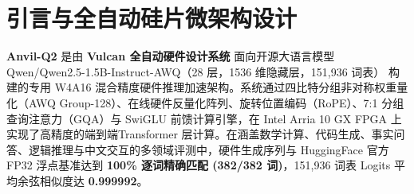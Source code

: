 \documentclass[11pt,a4paper]{article}
\begin{document}
\section{引言与全自动硅片微架构设计}

\textbf{Anvil-Q2} 是由 \textbf{Vulcan 全自动硬件设计系统} 面向开源大语言模型 Qwen/\allowbreak{}Qwen2.5-1.5B-Instruct-AWQ（28 层，1536 维隐藏层，151,\allowbreak{}936 词表） 构建的专用 W4A16 混合精度硬件推理加速架构。系统通过四比特分组非对称权重量化（AWQ Group-128）、在线硬件反量化阵列、旋转位置编码（RoPE）、7:1 分组查询注意力（GQA）与 SwiGLU 前馈计算引擎，在 Intel Arria 10 GX FPGA 上实现了高精度的端到端Transformer 层计算。在涵盖数学计算、代码生成、事实问答、逻辑推理与中文交互的多领域评测中，硬件生成序列与 HuggingFace 官方 FP32 浮点基准达到 \textbf{100\% 逐词精确匹配 (\allowbreak{}382/\allowbreak{}382 词)\allowbreak{}}，151,936 词表 Logits 平均余弦相似度达 \textbf{0.999992}。

\vspace{2pt}
\end{document}
